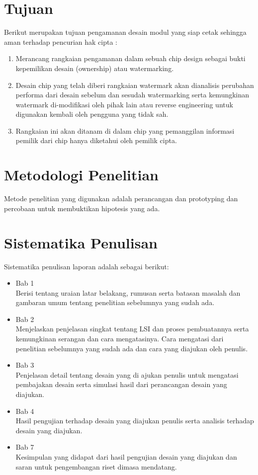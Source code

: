 \section{Tujuan}
Berikut merupakan tujuan pengamanan desain modul yang siap cetak sehingga aman terhadap pencurian hak cipta :
\begin{enumerate}
	\item Merancang rangkaian pengamanan dalam sebuah chip design sebagai bukti kepemilikan desain (ownership) atau watermarking.
	
	\item Desain chip yang telah diberi rangkaian watermark akan dianalisis perubahan performa dari desain sebelum dan sesudah watermarking serta kemungkinan watermark di-modifikasi oleh pihak lain atau reverse engineering untuk digunakan kembali oleh pengguna yang tidak	sah.
	
	\item Rangkaian ini akan ditanam di dalam chip yang pemanggilan informasi pemilik dari chip hanya diketahui oleh pemilik cipta.
\end{enumerate}

\section{Metodologi Penelitian}
Metode penelitian yang digunakan adalah perancangan dan prototyping dan percobaan untuk membuktikan hipotesis yang ada.

\section{Sistematika Penulisan}
Sistematika penulisan laporan adalah sebagai berikut:

\begin{itemize}
	
	\item Bab 1 \babSatu \\
	Berisi tentang uraian latar belakang, rumusan serta batasan masalah dan gambaran umum tentang penelitian sebelumnya yang sudah ada.
	
	\item Bab 2 \babDua \\
	Menjelaskan penjelasan singkat tentang LSI dan proses pembuatannya serta kemungkinan serangan dan cara mengatasinya. Cara mengatasi dari penelitian sebelumnya yang sudah ada dan cara yang diajukan oleh penulis.
	
	\item Bab 3 \babTiga \\
	Penjelasan detail tentang desain yang di ajukan penulis untuk mengatasi pembajakan desain serta simulasi hasil dari perancangan desain yang diajukan.

	\item Bab 4 \babEmpat \\
	Hasil pengujian terhadap desain yang diajukan penulis serta analisis terhadap desain yang diajukan.
	
	\item Bab 7 \kesimpulan \\
	Kesimpulan yang didapat dari hasil pengujian desain yang diajukan dan saran untuk pengembangan riset dimasa mendatang.
\end{itemize}